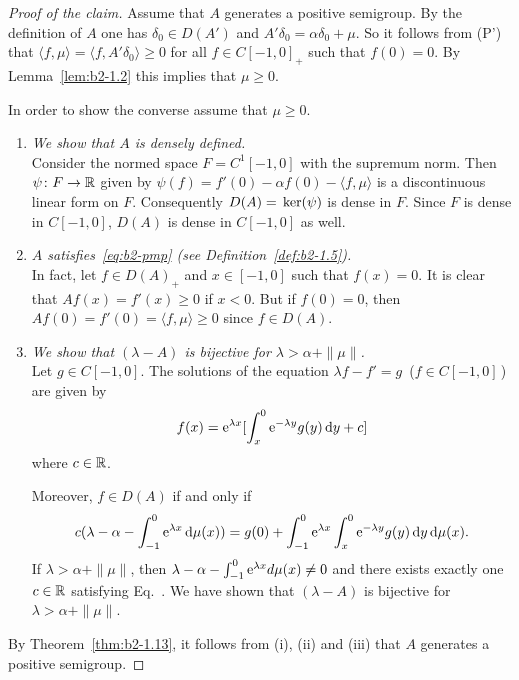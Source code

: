 \begin{proof}[Proof of the claim]
Assume that $A$ generates a positive semigroup.
By the definition of\/ $A$ one has $\delta_{0} \in D(A')$ and $A'\delta_{0} = \alpha\delta_{0} + \mu$.
So it follows from (P') that $\langle f,\mu \rangle = \langle f,A'\delta_{0} \rangle \geq 0$ for all $f \in C[-1,0]_{+}$ such that $f(0) = 0$.
By Lemma~\ref{lem:b2-1.2}
this implies that $\mu \geq 0$.

In order to show the converse assume that $\mu \geq 0$.
\begin{enumerate}[\upshape(i), wide, labelindent=.25em]

\item
\textit{We show that $A$ is densely defined.}\\
Consider the normed space $F = C^{1}[-1,0]$ with the supremum norm.
Then $\psi \colon F \to \mathbb{R}$ given by 
$\psi(f) = f'(0) - \alpha f(0) - \langle f,\mu \rangle$ 
is a discontinuous linear form on $F$.
Consequently $D(A) = \mathop{}\mathrm{ker}(\psi)$ is dense in $F$.
Since $F$ is dense in $C[-1,0]$, $D(A)$ is dense in $C[-1,0]$ as well.

\item
\textit{$A$ satisfies~\eqref{eq:b2-pmp} (see Definition~\ref{def:b2-1.5}).}\\
In fact, let $f \in D(A)_{+}$ and $x \in [-1,0]$ such that $f(x) = 0$.
It is clear that $Af(x) = f'(x) \geq 0$ if\/ $x < 0$.
But if\/ $f(0) = 0$, then $Af(0) = f'(0) = \langle f,\mu \rangle \geq 0$ since $f \in D(A)$.

\item
\textit{We show that $(\lambda-A)$ is bijective for $\lambda > \alpha + \|\mu\|$.}\\
Let $g \in C[-1,0]$.
The solutions of the equation $\lambda f - f' = g$ \,($f \in C[-1,0]$\,) are given by 
%
\[
	f(x) = \mathrm{e}^{\lambda x}[\int_{x}^{0} \mathrm{e}^{-\lambda y} g(y) \mathop{}\!\mathrm{d}{y} + c] 
\]
%
where $c \in \mathbb{R}$.

Moreover, $f \in D(A)$ if and only if
\begin{equation}\label{eq:b2-1.13}
c(\lambda - \alpha - \int_{-1}^{0} \mathrm{e}^{\lambda x} \mathop{}\!\mathrm{d}{\mu(x)}) = g(0) + \int_{-1}^{0} \mathrm{e}^{\lambda x} \int_{x}^{0}\mathrm{e}^{-\lambda y} g(y) \mathop{}\!\mathrm{d}{y}\mathop{}\!\mathrm{d}{\mu(x)}.
\end{equation}
If\/ $\lambda > \alpha + \|\mu\|$, then $\lambda - \alpha - \int_{-1}^{0} \mathrm{e}^{\lambda x} d\mu(x) \neq 0$ and there exists exactly one $c \in \mathbb{R}$ satisfying Eq.~.
We have shown that $(\lambda- A)$ is bijective for $\lambda > \alpha + \|\mu\|$.

\end{enumerate}
By Theorem~\ref{thm:b2-1.13}, it follows from \upshape(i), \upshape(ii) and \upshape(iii) that $A$ generates a positive semigroup.
\end{proof}
